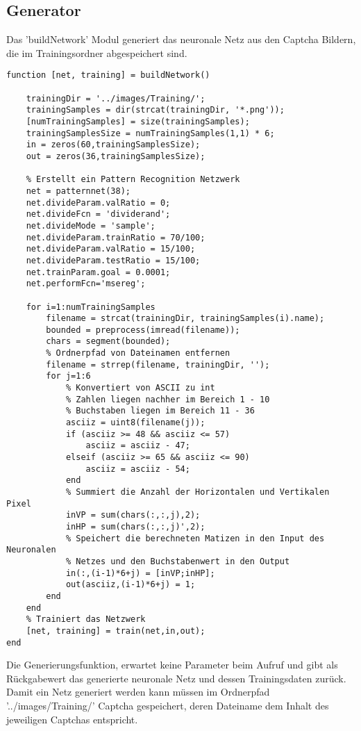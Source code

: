 \subsection{Generator}
Das 'buildNetwork' Modul generiert das neuronale Netz aus den Captcha Bildern, die im Trainingsordner abgespeichert sind.
\begin{lstlisting}
function [net, training] = buildNetwork()

    trainingDir = '../images/Training/';
    trainingSamples = dir(strcat(trainingDir, '*.png'));
    [numTrainingSamples] = size(trainingSamples);
    trainingSamplesSize = numTrainingSamples(1,1) * 6;
    in = zeros(60,trainingSamplesSize);
    out = zeros(36,trainingSamplesSize);
    
    % Erstellt ein Pattern Recognition Netzwerk
    net = patternnet(38);
    net.divideParam.valRatio = 0;
    net.divideFcn = 'dividerand';
    net.divideMode = 'sample';
    net.divideParam.trainRatio = 70/100;
    net.divideParam.valRatio = 15/100;
    net.divideParam.testRatio = 15/100;
    net.trainParam.goal = 0.0001;
    net.performFcn='msereg'; 
  
    for i=1:numTrainingSamples
        filename = strcat(trainingDir, trainingSamples(i).name);  
        bounded = preprocess(imread(filename));     
        chars = segment(bounded);
        % Ordnerpfad von Dateinamen entfernen
        filename = strrep(filename, trainingDir, '');
        for j=1:6
            % Konvertiert von ASCII zu int 
            % Zahlen liegen nachher im Bereich 1 - 10
            % Buchstaben liegen im Bereich 11 - 36
            asciiz = uint8(filename(j));
            if (asciiz >= 48 && asciiz <= 57)
                asciiz = asciiz - 47;
            elseif (asciiz >= 65 && asciiz <= 90)
                asciiz = asciiz - 54;
            end
            % Summiert die Anzahl der Horizontalen und Vertikalen Pixel
            inVP = sum(chars(:,:,j),2);
            inHP = sum(chars(:,:,j)',2);
            % Speichert die berechneten Matizen in den Input des Neuronalen
            % Netzes und den Buchstabenwert in den Output
            in(:,(i-1)*6+j) = [inVP;inHP];
            out(asciiz,(i-1)*6+j) = 1;
        end
    end
    % Trainiert das Netzwerk
    [net, training] = train(net,in,out);       
end
\end{lstlisting}
Die Generierungsfunktion, erwartet keine Parameter beim Aufruf und gibt als Rückgabewert das generierte neuronale Netz und dessen Trainingsdaten zurück.\\
Damit ein Netz generiert werden kann müssen im Ordnerpfad '../images/Training/' Captcha gespeichert, deren Dateiname dem Inhalt des jeweiligen Captchas entspricht.\\
